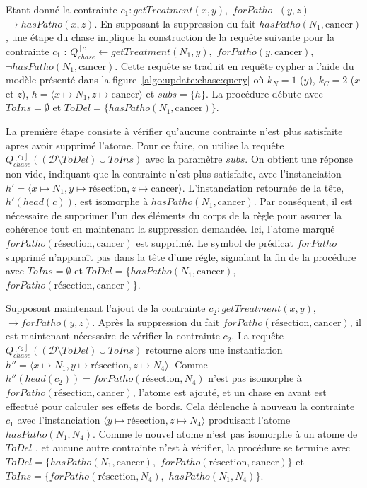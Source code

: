 \begin{example}
    \label{ex:update:chase:backward}
    Etant donné la contrainte $c_1 : getTreatment(x, y),$ $forPatho^-(y, z)$ $\to hasPatho(x, z)$.
    En supposant la suppression du fait $hasPatho(N_1, \text{cancer})$, une étape du chase implique la construction de la requête suivante pour la contrainte $c_1$ : $Q_{chase}^{[c]} \gets getTreatment(N_1, y),$ $forPatho(y, \text{cancer}),$ $\lnot hasPatho(N_1, \text{cancer})$.
    Cette requête se traduit en requête \gls{cypher} a l'aide du modèle présenté dans la figure~\ref{algo:update:chase:query} où $k_N = 1$ ($y$), $k_C = 2$ ($x$ et $z$), $h = \langle x \mapsto N_1, z \mapsto \text{cancer} \rangle$ et $subs = \{h\}$.
    La procédure débute avec $ToIns = \emptyset$ et $ToDel = \{hasPatho(N_1, \text{cancer})\}$.

    La première étape consiste à vérifier qu'aucune contrainte n'est plus satisfaite apres avoir supprimé l'atome.
    Pour ce faire, on utilise la requête $Q_{chase}^{[c_1]}((\mathcal{D} \setminus ToDel) \cup ToIns)$ avec la paramètre $subs$.
    On obtient une réponse non vide, indiquant que la contrainte n'est plus satisfaite, avec l'instanciation $h' = \langle x \mapsto N_1, y \mapsto \text{résection}, z \mapsto \text{cancer} \rangle$.
    L'instanciation retournée de la tête, $h'(head(c))$, est isomorphe à $hasPatho(N_1, \text{cancer})$.
    Par conséquent, il est nécessaire de supprimer l'un des éléments du corps de la règle pour assurer la cohérence tout en maintenant la suppression demandée.
    Ici, l'atome marqué $forPatho(\text{résection}, \text{cancer})$ est supprimé.
    Le symbol de prédicat $forPatho$ supprimé n'apparaît pas dans la tête d'une régle, signalant la fin de la procédure avec $ToIns = \emptyset$ et $ToDel = \{hasPatho(N_1, \text{cancer}),$ $forPatho(\text{résection}, \text{cancer})\}$.

    Supposont maintenant l'ajout de la contrainte $c_2 : getTreatment(x, y),$ $\to forPatho(y, z)$.
    Après la suppression du fait $forPatho(\text{résection}, \text{cancer})$, il est maintenant nécessaire de vérifier la contrainte $c_2$.
    La requête $Q_{chase}^{[c_2]}((\mathcal{D} \setminus ToDel) \cup ToIns)$ retourne alors une instantiation $h''= \langle x \mapsto N_1, y \mapsto \text{résection}, z \mapsto N_4 \rangle$.
    Comme $h''(head(c_2)) = forPatho(\text{résection}, N_4)$ n'est pas isomorphe à $forPatho(\text{résection}, \text{cancer})$, l'atome est ajouté, et un chase en avant est effectué pour calculer ses effets de bords.
    Cela déclenche à nouveau la contrainte $c_1$ avec l'instanciation $\langle y \mapsto \text{résection}, z \mapsto N_4 \rangle$ produisant l'atome $hasPatho(N_1, N_4)$.
    Comme le nouvel atome n'est pas isomorphe à un atome de $ToDel$ , et aucune autre contrainte n'est à vérifier, la procédure se termine avec $ToDel = \{hasPatho(N_1, \text{cancer}),$ $forPatho(\text{résection}, \text{cancer})\}$ et $ToIns = \{forPatho(\text{résection}, N_4),$ $hasPatho(N_1, N_4)\}$.
\end{example}
